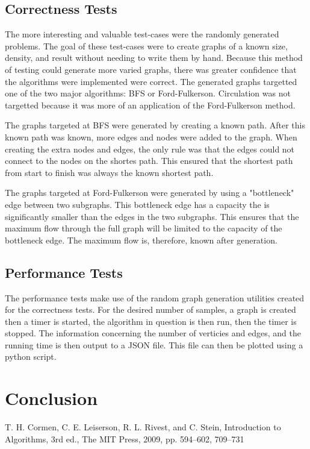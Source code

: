 \documentclass[conference]{IEEEtran}
\begin{document}
\subsection{Correctness Tests}
The more interesting and valuable test-cases were the randomly generated problems. The goal
of these test-cases were to create graphs of a known size, density, and result without needing
to write them by hand. Because this method of testing could generate more varied graphs, there 
was greater confidence that the algorithms were implemented were correct. The generated graphs 
targetted one of the two major algorithms: BFS or Ford-Fulkerson. Circulation was not targetted
because it was more of an application of the Ford-Fulkerson method.

The graphs targeted at BFS were generated by creating a known path. After this known path was
known, more edges and nodes were added to the graph. When creating the extra nodes and edges, 
the only rule was that the edges could not connect to the nodes on the shortes path. This 
ensured that the shortest path from start to finish was always the known shortest path. 

The graphs targeted at Ford-Fulkerson were generated by using a "bottleneck" edge between 
two subgraphs. This bottleneck edge has a capacity the is significantly smaller than the 
edges in the two subgraphs. This ensures that the maximum flow through the full graph
will be limited to the capacity of the bottleneck edge. The maximum flow is, therefore, 
known after generation.

\subsection{Performance Tests}\label{perf_explanation} %
The performance tests make use of the random graph generation utilities created for the 
correctness tests. For the desired number of samples, a graph is created then a timer is
started, the algorithm in question is then run, then the timer is stopped. The information
concerning the number of verticies and edges, and the running time is then output to a 
JSON file. This file can then be plotted using a python script. 


\section{Conclusion}

\begin{thebibliography}{00}
     T. H. Cormen, C. E. Leiserson, R. L. Rivest, and C. Stein, Introduction to Algorithms, 3rd ed., The MIT Press, 2009, pp. 594--602, 709--731 
\end{thebibliography}
\end{document}
